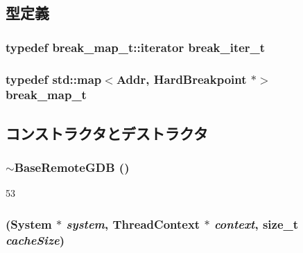 \subsection{型定義}
\hypertarget{classBaseRemoteGDB_aa4f6467b8be2918c47e0db3c90948fa2}{
\subsubsection[{break\_\-iter\_\-t}]{\setlength{\rightskip}{0pt plus 5cm}typedef break\_\-map\_\-t::iterator {\bf break\_\-iter\_\-t}}}
\label{classBaseRemoteGDB_aa4f6467b8be2918c47e0db3c90948fa2}
\hypertarget{classBaseRemoteGDB_a1d52d0c05b8ee640ddcd82fe5ec33593}{
\subsubsection[{break\_\-map\_\-t}]{\setlength{\rightskip}{0pt plus 5cm}typedef std::map$<${\bf Addr}, {\bf HardBreakpoint} $\ast$$>$ {\bf break\_\-map\_\-t}}}
\label{classBaseRemoteGDB_a1d52d0c05b8ee640ddcd82fe5ec33593}


\subsection{コンストラクタとデストラクタ}
\hypertarget{classBaseRemoteGDB_a04bcb8fd2ed15acbabc951b9a2714870}{
\subsubsection[{$\sim$BaseRemoteGDB}]{\setlength{\rightskip}{0pt plus 5cm}$\sim${\bf BaseRemoteGDB} ()}}
\label{classBaseRemoteGDB_a04bcb8fd2ed15acbabc951b9a2714870}



\begin{DoxyCode}
53 {}
\end{DoxyCode}
\hypertarget{classBaseRemoteGDB_a4adca95cc66bef1431e337cc867edf2d}{
\subsubsection[{BaseRemoteGDB}]{ ({\bf System} $\ast$ {\em system}, \/  {\bf ThreadContext} $\ast$ {\em context}, \/  size\_\-t {\em cacheSize})}}
\label{classBaseRemoteGDB_a4adca95cc66bef1431e337cc867edf2d}



